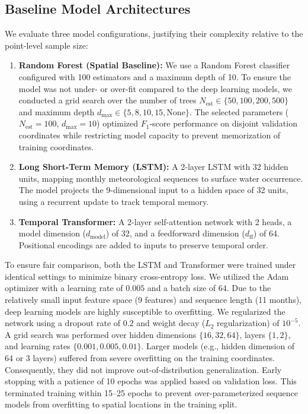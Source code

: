 \subsection{Baseline Model Architectures}
We evaluate three model configurations, justifying their complexity relative to the point-level sample size:
\begin{enumerate}
    \item \textbf{Random Forest (Spatial Baseline):} We use a Random Forest classifier configured with 100 estimators and a maximum depth of 10. To ensure the model was not under- or over-fit compared to the deep learning models, we conducted a grid search over the number of trees $N_{\text{est}} \in \{50, 100, 200, 500\}$ and maximum depth $d_{\text{max}} \in \{5, 8, 10, 15, \text{None}\}$. The selected parameters ($N_{\text{est}} = 100$, $d_{\text{max}} = 10$) optimized $F_1$-score performance on disjoint validation coordinates while restricting model capacity to prevent memorization of training coordinates.
    \item \textbf{Long Short-Term Memory (LSTM):} A 2-layer LSTM with 32 hidden units, mapping monthly meteorological sequences to surface water occurrence. The model projects the 9-dimensional input to a hidden space of 32 units, using a recurrent update to track temporal memory.
    \item \textbf{Temporal Transformer:} A 2-layer self-attention network with 2 heads, a model dimension ($d_{\text{model}}$) of 32, and a feedforward dimension ($d_{\text{ff}}$) of 64. Positional encodings are added to inputs to preserve temporal order.
\end{enumerate}

To ensure fair comparison, both the LSTM and Transformer were trained under identical settings to minimize binary cross-entropy loss. We utilized the Adam optimizer with a learning rate of $0.005$ and a batch size of $64$. Due to the relatively small input feature space (9 features) and sequence length (11 months), deep learning models are highly susceptible to overfitting. We regularized the network using a dropout rate of $0.2$ and weight decay ($L_2$ regularization) of $10^{-5}$. A grid search was performed over hidden dimensions $\{16, 32, 64\}$, layers $\{1, 2\}$, and learning rates $\{0.001, 0.005, 0.01\}$. Larger models (e.g., hidden dimension of 64 or 3 layers) suffered from severe overfitting on the training coordinates. Consequently, they did not improve out-of-distribution generalization. Early stopping with a patience of 10 epochs was applied based on validation loss. This terminated training within 15--25 epochs to prevent over-parameterized sequence models from overfitting to spatial locations in the training split.

